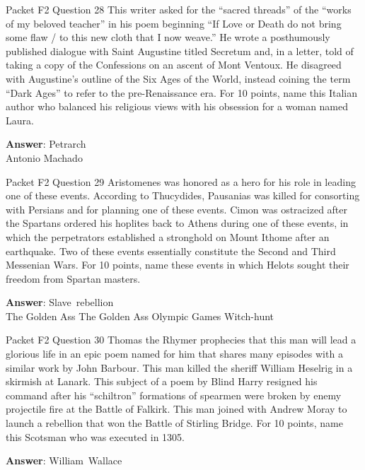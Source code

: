 \begin{frame}{Packet F2 Question 28}
This writer asked for   the “sacred threads” of the “works of my beloved teacher” in his poem beginning “If Love or Death do not bring some flaw / to this new cloth that I now weave.” He wrote a posthumously published dialogue with Saint Augustine titled Secretum       and, in a letter, told of taking a copy of the Confessions on an ascent of Mont   Ventoux. He disagreed with Augustine’s outline of the Six Ages of the World, instead coining the term “Dark Ages” to refer to the pre-Renaissance era. For 10 points, name this Italian author who balanced his religious views with his obsession for a woman named Laura.

\textbf{Answer}: Petrarch\\
 Antonio Machado
\end{frame}

\begin{frame}{Packet F2 Question 29}
Aristomenes was honored     as a hero for his role in leading one of these events. According to Thucydides, Pausanias was killed for consorting with Persians and for planning one of these events. Cimon was ostracized after the Spartans ordered his hoplites back to Athens during one of these events, in which the perpetrators established a stronghold on Mount Ithome after an earthquake. Two of these events essentially constitute the Second and Third Messenian Wars. For 10 points, name these events in which Helots sought their freedom from Spartan masters.    

\textbf{Answer}: Slave\ rebellion\\
 The Golden Ass
 The Golden Ass
 Olympic Games
 Witch-hunt
\end{frame}

\begin{frame}{Packet F2 Question 30}
Thomas the Rhymer prophecies that this man will lead a glorious life in an epic poem named for him that shares many episodes with a similar work by John Barbour. This man killed the sheriff William Heselrig in a skirmish at Lanark. This subject   of a poem by Blind Harry resigned his   command after his “schiltron”   formations of spearmen were broken by enemy projectile fire at the Battle of Falkirk. This man joined with Andrew Moray to launch a rebellion that won the Battle of Stirling Bridge. For 10   points, name this Scotsman who was executed in 1305.

\textbf{Answer}: William\ Wallace\\
\end{frame}


